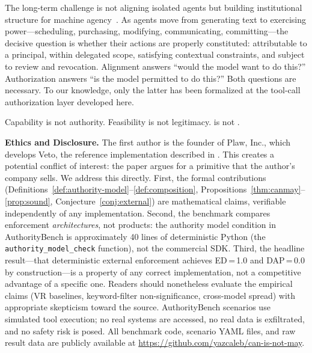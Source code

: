 \documentclass[11pt,a4paper]{article}
\newcommand{\termlabel}[1]{\ifmmode\mathsf{#1}\else{\normalfont\textsc{\MakeLowercase{#1}}}\fi}
\newcommand{\May}{\termlabel{May}}
\newcommand{\Can}{\termlabel{Can}}
\begin{document}
The long-term challenge is not aligning isolated agents but building institutional structure for machine agency~\citep{chan2025infrastructure, pierucci2026institutionalai}. As agents move from generating text to exercising power---scheduling, purchasing, modifying, communicating, committing---the decisive question is whether their actions are properly constituted: attributable to a principal, within delegated scope, satisfying contextual constraints, and subject to review and revocation. Alignment answers ``would the model want to do this?'' Authorization answers ``is the model permitted to do this?'' Both questions are necessary. To our knowledge, only the latter has been formalized at the tool-call authorization layer developed here.

Capability is not authority. Feasibility is not legitimacy. \Can{} is not \May{}.

\vspace{8pt}
\noindent\textbf{Ethics and Disclosure.} The first author is the founder of Plaw, Inc., which develops Veto, the reference implementation described in . This creates a potential conflict of interest: the paper argues for a primitive that the author's company sells. We address this directly. First, the formal contributions (Definitions~\ref{def:authority-model}--\ref{def:composition}, Propositions~\ref{thm:canmay}--\ref{prop:sound}, Conjecture~\ref{conj:external}) are mathematical claims, verifiable independently of any implementation. Second, the benchmark compares enforcement \emph{architectures}, not products: the authority model condition in AuthorityBench is approximately 40 lines of deterministic Python (the \texttt{authority\_model\_check} function), not the commercial SDK. Third, the headline result---that deterministic external enforcement achieves ED\,=\,1.0 and DAP\,=\,0.0 by construction---is a property of any correct implementation, not a competitive advantage of a specific one. Readers should nonetheless evaluate the empirical claims (VR baselines, keyword-filter non-significance, cross-model spread) with appropriate skepticism toward the source. AuthorityBench scenarios use simulated tool execution; no real systems are accessed, no real data is exfiltrated, and no safety risk is posed. All benchmark code, scenario YAML files, and raw result data are publicly available at \url{https://github.com/yazcaleb/can-is-not-may}.


\appendix
\end{document}

